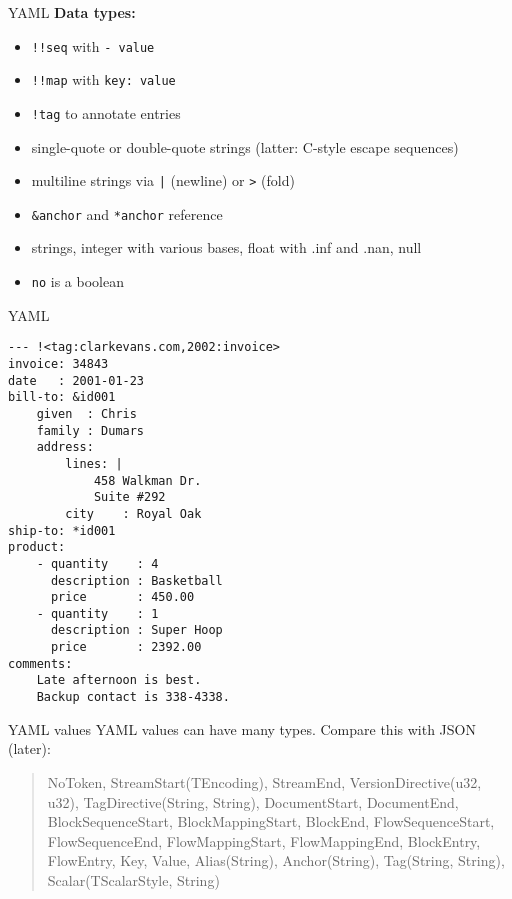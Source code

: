 \documentclass{beamer}
\begin{document}
\begin{frame}[fragile]{YAML}
  \textbf{Data types:}
  \begin{itemize}
    \item \texttt{!!seq} with \texttt{- value}
    \item \texttt{!!map} with \texttt{key: value}
    \item \texttt{!tag} to annotate entries
    \item single-quote or double-quote strings (latter: C-style escape sequences)
    \item multiline strings via \texttt{|} (newline) or \texttt{>} (fold)
    \item \texttt{&anchor} and \texttt{*anchor} reference
    \item strings, integer with various bases, float with .inf and .nan, null
    \item \texttt{no} is a boolean
  \end{itemize}
\end{frame}

\begin{frame}[fragile]{YAML}
  \begin{verbatim}
--- !<tag:clarkevans.com,2002:invoice>
invoice: 34843
date   : 2001-01-23
bill-to: &id001
    given  : Chris
    family : Dumars
    address:
        lines: |
            458 Walkman Dr.
            Suite #292
        city    : Royal Oak
ship-to: *id001
product:
    - quantity    : 4
      description : Basketball
      price       : 450.00
    - quantity    : 1
      description : Super Hoop
      price       : 2392.00
comments:
    Late afternoon is best.
    Backup contact is 338-4338.
  \end{verbatim}
\end{frame}

\begin{frame}[fragile]{YAML values}
  YAML values can have many types. Compare this with JSON (later):

  \begin{quote}
    NoToken, 
    StreamStart(TEncoding), 
    StreamEnd, 
    VersionDirective(u32, u32), 
    TagDirective(String, String), 
    DocumentStart, 
    DocumentEnd, 
    BlockSequenceStart, 
    BlockMappingStart, 
    BlockEnd, 
    FlowSequenceStart, 
    FlowSequenceEnd, 
    FlowMappingStart, 
    FlowMappingEnd, 
    BlockEntry, 
    FlowEntry, 
    Key, 
    Value, 
    Alias(String), 
    Anchor(String), 
    Tag(String, String), 
    Scalar(TScalarStyle, String)
  \end{quote}
\end{frame}
\end{document}
